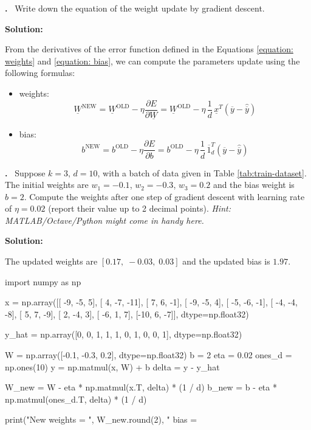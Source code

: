 \documentclass[a4paper,12pt]{article} %
\newcounter{problem}
\newcounter{solution}
\newcommand\Problem{%
	\stepcounter{problem}%
	\textbf{\theproblem.}~%
	\setcounter{solution}{0}%
}
\newcommand\Solution{%
	\textbf{Solution:}\\%
}
\begin{document}
	\Problem{Write down the equation of the weight update by gradient 
	descent.}\medskip
	
	\Solution{	
		From the derivatives of the error function defined in the Equations 
		\ref{equation: weights} and \ref{equation: bias}, we can compute the 
		parameters update using the following formulas:
		\begin{itemize}
		\item weights:
			\begin{equation}
				\underline{W}^{\mathrm{NEW}}=\underline{W}^{\mathrm{OLD}}-\eta 
				\frac{\partial E}{\partial\underline{W}} = 
				\underline{W}^{\mathrm{OLD}} - \eta \, \frac{1}{d} \, 
				\underline{x}^T(\overline{y}-\hat{\overline{y}})
			\end{equation}
		\item bias:
			\begin{equation}
				{b}^{\mathrm{NEW}}={b}^{\mathrm{OLD}}-\eta 
				\frac{\partial E}{\partial {b}} = {b}^{\mathrm{OLD}}-\eta \, 
				\frac{1}{d} \, \overline{1}_d^T (\overline{y} - 
				\hat{\overline{y}})
			\end{equation}
		\end{itemize}
	}\vspace{0.4cm}
	
	\Problem{Suppose $k = 3\mbox{, }d =10$, with a batch of data given in Table 
	\ref{tab:train-dataset}. The initial weights are $w_1 = -0.1$, $w_2 = 
	-0.3$, $w_3 = 0.2$ and the bias weight is $b = 2$. Compute the weights 
	after one step of gradient descent with learning rate of $\eta = 0.02$ 
	(report their value up to 2 decimal points). \textit{Hint: 
	MATLAB/Octave/Python might come in handy here.}}\medskip
	
	\Solution{
		The updated weights are $[0.17, \; -0.03, \; 0.03]$ and the updated 
		bias is $1.97$.
		
		\begin{python}
import numpy as np
			
x = np.array([[ -9, -5,    5],
			   [   4, -7, -11],
			   [   7,   6,  -1],
			   [ -9, -5,    4],
			   [ -5, -6,  -1],
			   [ -4, -4,  -8],
			   [   5,   7,  -9],
			   [   2, -4,    3],
			   [ -6,   1,    7],
			   [-10,   6,  -7]], dtype=np.float32)
			   
y_hat = np.array([0, 0, 1, 1, 1, 0, 1, 0, 0, 1], dtype=np.float32)
	
W = np.array([-0.1, -0.3, 0.2], dtype=np.float32)
b = 2			
eta = 0.02
ones_d = np.ones(10)
y = np.matmul(x, W) + b
delta = y - y_hat

W_new = W - eta * np.matmul(x.T, delta) * (1 / d)
b_new = b - eta * np.matmul(ones_d.T, delta) * (1 / d)

print("New weights = ", W_new.round(2), " \nNew bias = %
		\end{python}
		
	}\vspace{0.4cm}
	
\end{document}
